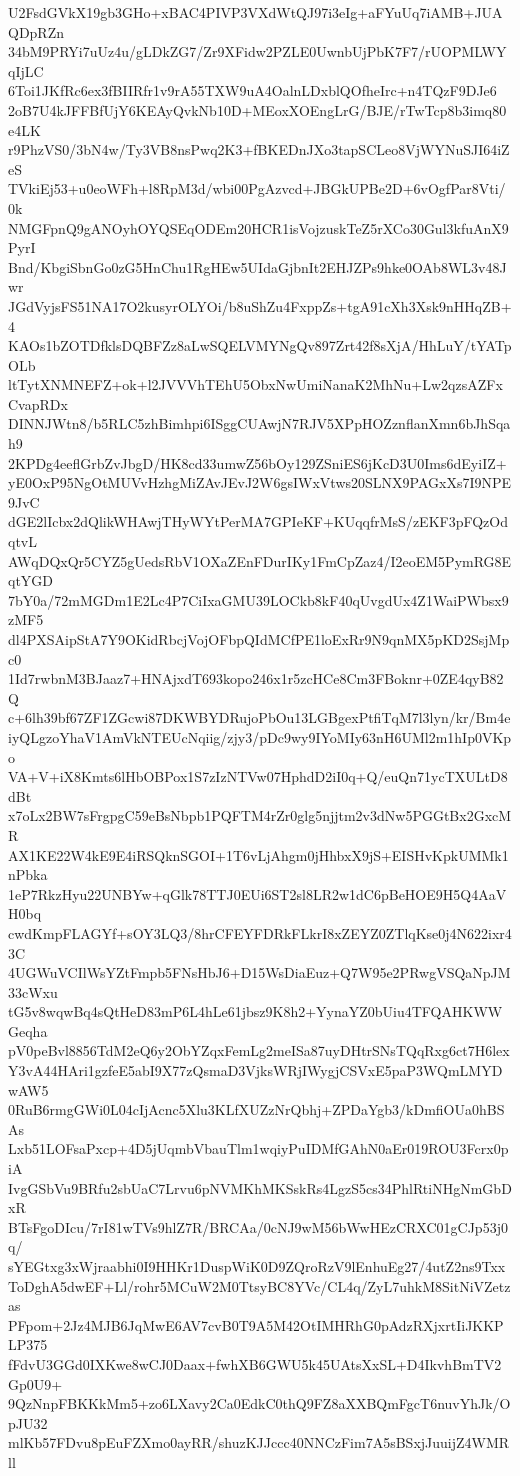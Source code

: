 U2FsdGVkX19gb3GHo+xBAC4PIVP3VXdWtQJ97i3eIg+aFYuUq7iAMB+JUAQDpRZn
34bM9PRYi7uUz4u/gLDkZG7/Zr9XFidw2PZLE0UwnbUjPbK7F7/rUOPMLWYqIjLC
6Toi1JKfRc6ex3fBIIRfr1v9rA55TXW9uA4OalnLDxblQOfheIrc+n4TQzF9DJe6
2oB7U4kJFFBfUjY6KEAyQvkNb10D+MEoxXOEngLrG/BJE/rTwTcp8b3imq80e4LK
r9PhzVS0/3bN4w/Ty3VB8nsPwq2K3+fBKEDnJXo3tapSCLeo8VjWYNuSJI64iZeS
TVkiEj53+u0eoWFh+l8RpM3d/wbi00PgAzvcd+JBGkUPBe2D+6vOgfPar8Vti/0k
NMGFpnQ9gANOyhOYQSEqODEm20HCR1isVojzuskTeZ5rXCo30Gul3kfuAnX9PyrI
Bnd/KbgiSbnGo0zG5HnChu1RgHEw5UIdaGjbnIt2EHJZPs9hke0OAb8WL3v48Jwr
JGdVyjsFS51NA17O2kusyrOLYOi/b8uShZu4FxppZs+tgA91cXh3Xsk9nHHqZB+4
KAOs1bZOTDfklsDQBFZz8aLwSQELVMYNgQv897Zrt42f8sXjA/HhLuY/tYATpOLb
ltTytXNMNEFZ+ok+l2JVVVhTEhU5ObxNwUmiNanaK2MhNu+Lw2qzsAZFxCvapRDx
DINNJWtn8/b5RLC5zhBimhpi6ISggCUAwjN7RJV5XPpHOZznflanXmn6bJhSqah9
2KPDg4eeflGrbZvJbgD/HK8cd33umwZ56bOy129ZSniES6jKcD3U0Ims6dEyiIZ+
yE0OxP95NgOtMUVvHzhgMiZAvJEvJ2W6gsIWxVtws20SLNX9PAGxXs7I9NPE9JvC
dGE2lIcbx2dQlikWHAwjTHyWYtPerMA7GPIeKF+KUqqfrMsS/zEKF3pFQzOdqtvL
AWqDQxQr5CYZ5gUedsRbV1OXaZEnFDurIKy1FmCpZaz4/I2eoEM5PymRG8EqtYGD
7bY0a/72mMGDm1E2Lc4P7CiIxaGMU39LOCkb8kF40qUvgdUx4Z1WaiPWbsx9zMF5
dl4PXSAipStA7Y9OKidRbcjVojOFbpQIdMCfPE1loExRr9N9qnMX5pKD2SsjMpc0
1Id7rwbnM3BJaaz7+HNAjxdT693kopo246x1r5zcHCe8Cm3FBoknr+0ZE4qyB82Q
c+6lh39bf67ZF1ZGcwi87DKWBYDRujoPbOu13LGBgexPtfiTqM7l3lyn/kr/Bm4e
iyQLgzoYhaV1AmVkNTEUcNqiig/zjy3/pDc9wy9IYoMIy63nH6UMl2m1hIp0VKpo
VA+V+iX8Kmts6lHbOBPox1S7zIzNTVw07HphdD2iI0q+Q/euQn71ycTXULtD8dBt
x7oLx2BW7sFrgpgC59eBsNbpb1PQFTM4rZr0glg5njjtm2v3dNw5PGGtBx2GxcMR
AX1KE22W4kE9E4iRSQknSGOI+1T6vLjAhgm0jHhbxX9jS+EISHvKpkUMMk1nPbka
1eP7RkzHyu22UNBYw+qGlk78TTJ0EUi6ST2sl8LR2w1dC6pBeHOE9H5Q4AaVH0bq
cwdKmpFLAGYf+sOY3LQ3/8hrCFEYFDRkFLkrI8xZEYZ0ZTlqKse0j4N622ixr43C
4UGWuVCIlWsYZtFmpb5FNsHbJ6+D15WsDiaEuz+Q7W95e2PRwgVSQaNpJM33cWxu
tG5v8wqwBq4sQtHeD83mP6L4hLe61jbsz9K8h2+YynaYZ0bUiu4TFQAHKWWGeqha
pV0peBvl8856TdM2eQ6y2ObYZqxFemLg2meISa87uyDHtrSNsTQqRxg6ct7H6lex
Y3vA44HAri1gzfeE5abI9X77zQsmaD3VjksWRjIWygjCSVxE5paP3WQmLMYDwAW5
0RuB6rmgGWi0L04cIjAcnc5Xlu3KLfXUZzNrQbhj+ZPDaYgb3/kDmfiOUa0hBSAs
Lxb51LOFsaPxcp+4D5jUqmbVbauTlm1wqiyPuIDMfGAhN0aEr019ROU3Fcrx0piA
IvgGSbVu9BRfu2sbUaC7Lrvu6pNVMKhMKSskRs4LgzS5cs34PhlRtiNHgNmGbDxR
BTsFgoDIcu/7rI81wTVs9hlZ7R/BRCAa/0cNJ9wM56bWwHEzCRXC01gCJp53j0q/
sYEGtxg3xWjraabhi0I9HHKr1DuspWiK0D9ZQroRzV9lEnhuEg27/4utZ2ns9Txx
ToDghA5dwEF+Ll/rohr5MCuW2M0TtsyBC8YVc/CL4q/ZyL7uhkM8SitNiVZetzas
PFpom+2Jz4MJB6JqMwE6AV7cvB0T9A5M42OtIMHRhG0pAdzRXjxrtIiJKKPLP375
fFdvU3GGd0IXKwe8wCJ0Daax+fwhXB6GWU5k45UAtsXxSL+D4IkvhBmTV2Gp0U9+
9QzNnpFBKKkMm5+zo6LXavy2Ca0EdkC0thQ9FZ8aXXBQmFgcT6nuvYhJk/OpJU32
mlKb57FDvu8pEuFZXmo0ayRR/shuzKJJccc40NNCzFim7A5sBSxjJuuijZ4WMRll

